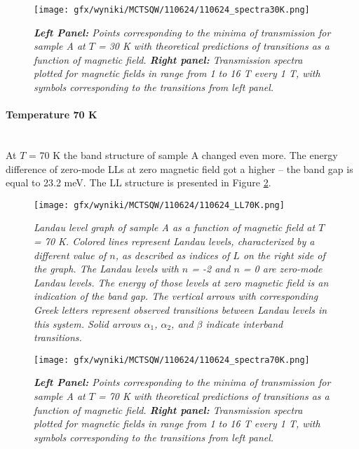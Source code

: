 \documentclass[titlepage,a4paper]{book}
\newcommand{\wciecie}{\quad\phantom{v}}
\newcommand{\myparagraph}[1]{\paragraph{#1}\mbox{}\\}
\begin{document}
\begin{figure}[H]
	\centering
	\texttt{[image: gfx/wyniki/MCTSQW/110624/110624\_spectra30K.png]}
	\vspace{-10pt}
	\caption{\textit{\textbf{Left Panel:} Points corresponding to the minima of transmission for sample A at $T$ = 30 K with theoretical predictions of transitions as a function of magnetic field. \textbf{Right panel:} Transmission spectra plotted for magnetic fields in range from 1 to 16 T every 1 T, with symbols corresponding to the transitions from left panel.}}
	\label{fig:Spectra_110624_30K}
\end{figure}

\myparagraph{Temperature 70 K}
\wciecie
At $T$ = 70 K the band structure of sample A changed even more. The energy difference of zero-mode LLs at zero magnetic field got a higher -- the band gap is equal to 23.2 meV. The LL structure is presented in Figure \ref{fig:LL_110624_70K}.

\begin{figure}[H]
	\centering
	\texttt{[image: gfx/wyniki/MCTSQW/110624/110624\_LL70K.png]}
	\vspace{-10pt}
	\caption{\textit{Landau level graph of sample A as a function of magnetic field at $T$ = 70 K. Colored lines represent Landau levels, characterized by a different value of $n$, as described as indices of $L$ on the right side of the graph. The Landau levels with $n$ = -2 and $n$ = 0 are zero-mode Landau levels. The energy of those levels at zero magnetic field is an indication of the band gap. The vertical arrows with corresponding Greek letters represent observed transitions between Landau levels in this system. Solid arrows $\alpha_1$, $\alpha_2$, and $\beta$ indicate interband transitions.}}
	\label{fig:LL_110624_70K}
\end{figure}

\begin{figure}[ht]
	\centering
	\texttt{[image: gfx/wyniki/MCTSQW/110624/110624\_spectra70K.png]}
	\vspace{-10pt}
	\caption{\textit{\textbf{Left Panel:} Points corresponding to the minima of transmission for sample A at $T$ = 70 K with theoretical predictions of transitions as a function of magnetic field. \textbf{Right panel:} Transmission spectra plotted for magnetic fields in range from 1 to 16 T every 1 T, with symbols corresponding to the transitions from left panel.}}
	\label{fig:Spectra_110624_70K}
\end{figure}
\end{document}
